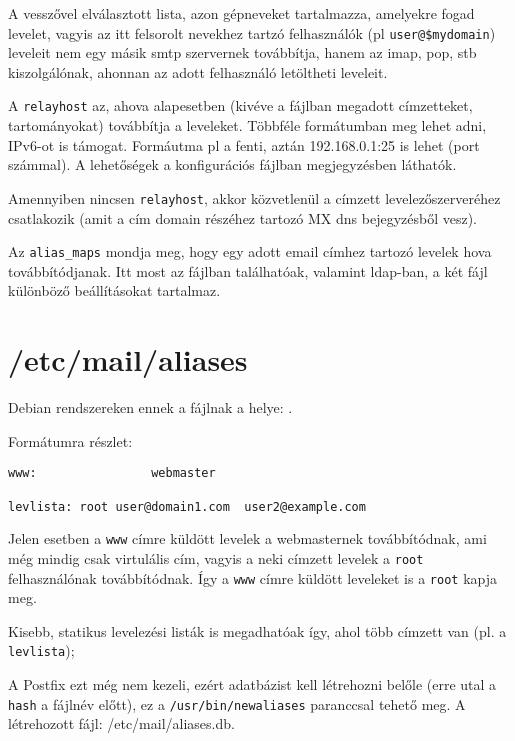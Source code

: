 A  vesszővel elválasztott lista, azon gépneveket tartalmazza, amelyekre fogad levelet, vagyis az
itt felsorolt nevekhez tartzó felhasználók (pl \texttt{user@\$mydomain}) leveleit nem egy másik smtp szervernek
továbbítja, hanem az imap, pop, stb kiszolgálónak, ahonnan az adott felhasználó letöltheti leveleit.

A \texttt{relayhost} az, ahova alapesetben (kivéve a  fájlban megadott címzetteket,
tartományokat) továbbítja a leveleket. Többféle formátumban meg lehet adni, IPv6-ot is támogat. Formáutma pl a fenti,
aztán 192.168.0.1:25 is lehet (port számmal). A lehetőségek a konfigurációs fájlban megjegyzésben láthatók.

Amennyiben nincsen \texttt{relayhost}, akkor közvetlenül a címzett levelezőszerveréhez csatlakozik (amit a cím domain
részéhez tartozó MX dns bejegyzésből vesz).

Az \texttt{alias\_maps} mondja meg, hogy egy adott email címhez tartozó levelek hova továbbítódjanak. Itt most az
 fájlban találhatóak, valamint ldap-ban, a két fájl különböző beállításokat tartalmaz.

\section{/etc/mail/aliases}
Debian rendszereken ennek a fájlnak a helye: .

Formátumra részlet:\\
\begin{Verbatim}[frame=single,label=aliases részlet]
www:                webmaster

levlista: root user@domain1.com  user2@example.com
\end{Verbatim}

Jelen esetben a \texttt{www} címre küldött levelek a webmasternek továbbítódnak, ami még mindig csak virtulális cím,
vagyis a neki címzett levelek a \texttt{root} felhasználónak továbbítódnak. Így a \texttt{www} címre küldött leveleket
is a \texttt{root} kapja meg.

Kisebb, statikus levelezési listák is megadhatóak így, ahol több címzett van (pl. a \texttt{levlista});

A Postfix ezt még nem kezeli, ezért adatbázist kell létrehozni belőle (erre utal a \texttt{hash} a fájlnév előtt), ez
a \texttt{/usr/bin/newaliases} paranccsal tehető meg. A létrehozott fájl: /etc/mail/aliases.db.



